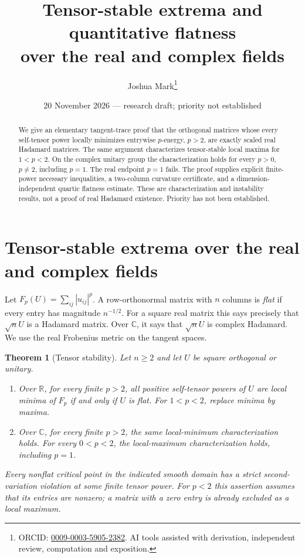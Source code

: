 \documentclass[11pt]{article}
\title{Tensor-stable extrema and quantitative flatness\\over the real and complex fields}
\author{Joshua Mark\thanks{ORCID: \href{https://orcid.org/0009-0003-5905-2382}{0009-0003-5905-2382}. AI tools assisted with derivation, independent review, computation and exposition.}}
\date{20 November 2026 --- research draft; priority not established}
\newtheorem{theorem}{Theorem}[section]
\begin{document}
\maketitle
\begin{abstract}
We give an elementary tangent-trace proof that the orthogonal matrices
whose every self-tensor power locally minimizes entrywise $p$-energy,
$p>2$, are exactly scaled real Hadamard matrices. The same argument
characterizes tensor-stable local maxima for $1<p<2$. On the complex
unitary group the characterization holds for every $p>0$, $p\ne2$,
including $p=1$. The real endpoint $p=1$ fails. The proof supplies
explicit finite-power necessary inequalities, a two-column curvature
certificate, and a dimension-independent quartic flatness estimate.
These are characterization and instability results, not a proof of
real Hadamard existence. Priority has not been established.
\end{abstract}

\section{Tensor-stable extrema over the real and complex fields}
Let $F_p(U)=\sum_{ij}|u_{ij}|^p$. A row-orthonormal matrix with $n$
columns is \emph{flat} if every entry has magnitude $n^{-1/2}$.
For a square real matrix this says precisely that $\sqrt nU$ is a
Hadamard matrix. Over $\mathbb C$, it says that $\sqrt nU$ is complex
Hadamard. We use the real Frobenius metric on the tangent spaces.

\begin{theorem}[Tensor stability]\label{thm:unified}
Let $n\ge2$ and let $U$ be square orthogonal or unitary.
\begin{enumerate}
\item Over $\mathbb R$, for every finite $p>2$, all positive
self-tensor powers of $U$ are local minima of $F_p$ if and only if
$U$ is flat. For $1<p<2$, replace minima by maxima.
\item Over $\mathbb C$, for every finite $p>2$, the same local-minimum
characterization holds. For every $0<p<2$, the local-maximum
characterization holds, including $p=1$.
\end{enumerate}
Every nonflat critical point in the indicated smooth domain has a
strict second-variation violation at some finite tensor power. For
$p<2$ this assertion assumes that its entries are nonzero; a matrix
with a zero entry is already excluded as a local maximum.
\end{theorem}
\end{document}
